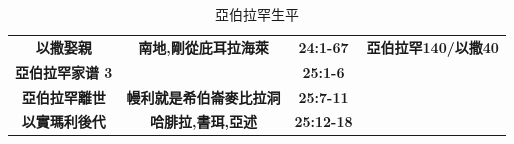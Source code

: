 \begin{table}[!hbp]
\begin{threeparttable}
\begin{tabular}{c c c c}
\multicolumn{1}{L{\dimexpr0.25\linewidth-1\tabcolsep\relax}}{\bfseries 以撒娶親} 
& \multicolumn{1}{L{\dimexpr0.2\linewidth-1\tabcolsep\relax}}{\bfseries 南地,剛從庇耳拉海萊}  
& \multicolumn{1}{L{\dimexpr0.1\linewidth-1\tabcolsep\relax}}{\bfseries 24:1-67}
& \multicolumn{1}{L{\dimexpr0.22\linewidth-1\tabcolsep\relax}}{\bfseries 亞伯拉罕140/以撒40}\\

\multicolumn{1}{L{\dimexpr0.25\linewidth-1\tabcolsep\relax}}{\bfseries 亞伯拉罕家谱 3} 
& \multicolumn{1}{L{\dimexpr0.2\linewidth-1\tabcolsep\relax}}{\bfseries }  
& \multicolumn{1}{L{\dimexpr0.1\linewidth-1\tabcolsep\relax}}{\bfseries 25:1-6}
& \multicolumn{1}{L{\dimexpr0.2\linewidth-1\tabcolsep\relax}}{\bfseries }\\

\multicolumn{1}{L{\dimexpr0.25\linewidth-1\tabcolsep\relax}}{\bfseries 亞伯拉罕離世}  
& \multicolumn{1}{L{\dimexpr0.2\linewidth-1\tabcolsep\relax}}{\bfseries 幔利就是希伯崙麥比拉洞} 
& \multicolumn{1}{L{\dimexpr0.1\linewidth-1\tabcolsep\relax}}{\bfseries 25:7-11}
& \multicolumn{1}{L{\dimexpr0.2\linewidth-1\tabcolsep\relax}}{\bfseries }\\

\multicolumn{1}{L{\dimexpr0.25\linewidth-1\tabcolsep\relax}}{\bfseries 以實瑪利後代} 
& \multicolumn{1}{L{\dimexpr0.2\linewidth-1\tabcolsep\relax}}{\bfseries 哈腓拉,書珥,亞述}  
& \multicolumn{1}{L{\dimexpr0.1\linewidth-1\tabcolsep\relax}}{\bfseries 25:12-18}
& \multicolumn{1}{L{\dimexpr0.2\linewidth-1\tabcolsep\relax}}{\bfseries }\\\bottomrule
\end{tabular}
\caption{亞伯拉罕生平}
\label{table:YaBoLanShengPing}
\end{threeparttable}
\end{table}


